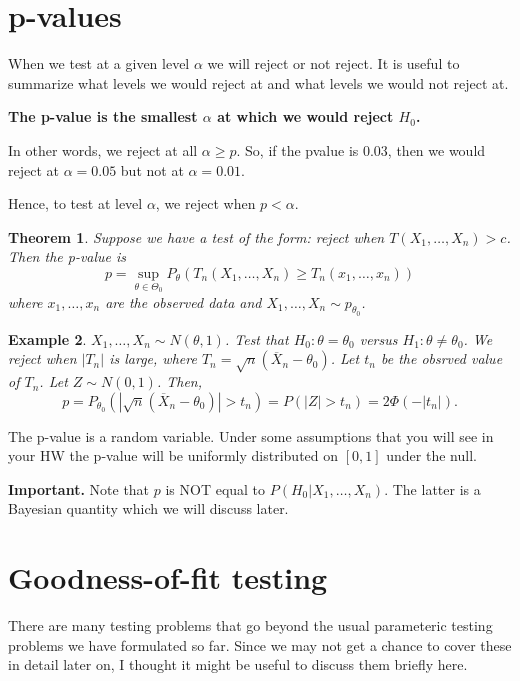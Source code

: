 \documentclass[twoside,12pt]{article}
\newcounter{lecnum}
\newtheorem{theorem}{Theorem}[lecnum]
\newtheorem{example}[theorem]{Example}
\begin{document}
\section{p-values}

When we test at a given level $\alpha$ we will reject
or not reject.
It is useful to summarize what levels we would reject at and what levels we would not reject at.

\vspace{1cm}

\noindent
{\bf The p-value is the smallest $\alpha$ at which we would reject $H_0$.}

\vspace{1cm}

\noindent
In other words, we reject at all $\alpha \geq p$.
So, if the pvalue is 0.03, then
we would reject at $\alpha =0.05$ but not at
$\alpha =0.01$.

Hence, to test at level $\alpha$, we reject when $p < \alpha$.


\begin{theorem}
Suppose we have a test of the form: reject when
$T(X_1,\ldots, X_n) > c$. Then
the p-value is
$$
p = \sup_{\theta\in\Theta_0}P_\theta(T_n(X_1,\ldots, X_n)\geq T_n(x_1,\ldots,x_n))
$$
where $x_1,\ldots, x_n$ are the observed data and
$X_1,\ldots,X_n \sim p_{\theta_0}$.
\end{theorem}

\begin{example}
$X_1,\ldots, X_n \sim N(\theta,1)$.
Test that $H_0:\theta = \theta_0$ versus
$H_1:\theta \neq \theta_0$.
We reject when $|T_n|$ is large, where
$T_n = \sqrt{n}(\overline{X}_n - \theta_0)$.
Let $t_n$ be the obsrved value of $T_n$.
Let $Z\sim N(0,1)$.
Then,
$$
p = P_{\theta_0}\left( |\sqrt{n}(\overline{X}_n - \theta_0)| > t_n\right) =
P( |Z| > t_n) = 2\Phi(-|t_n|).
$$
\end{example}

The p-value is a random variable. Under some assumptions that you will see in your HW the p-value will be uniformly distributed on $[0,1]$ under the null.

{\bf Important.}
Note that $p$ is NOT equal to $P(H_0|X_1,\ldots, X_n)$.
The latter is a Bayesian quantity which we will discuss later.
\section{Goodness-of-fit testing}
There are many testing problems that go beyond the usual parameteric testing problems we have formulated so far. Since we may not get a chance to cover these in detail later on, I thought it might be useful to discuss them briefly here.
\end{document}
